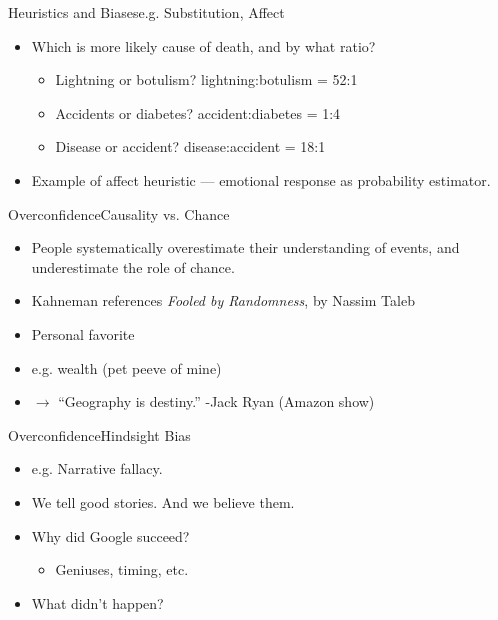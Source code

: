 \documentclass{beamer}
\begin{document}
\begin{frame}{Heuristics and Biases}{e.g. Substitution, Affect}
\begin{itemize}
\item Which is more likely cause of death, and by what ratio? 
    \begin{itemize}
    \addtolength{\itemsep}{0.5\baselineskip}
    \item Lightning or botulism? lightning:botulism = 52:1
    \item Accidents or diabetes? accident:diabetes = 1:4
    \item Disease or accident? disease:accident = 18:1
    \end{itemize}
\item Example of affect heuristic --- emotional response as probability estimator.
\end{itemize}
\end{frame}


\begin{frame}{Overconfidence}{Causality vs. Chance}
\begin{itemize}
\addtolength{\itemsep}{0.5\baselineskip}
\item People systematically overestimate their understanding of events, and underestimate the role of chance.
\item Kahneman references {\it Fooled by Randomness}, by Nassim Taleb
\item Personal favorite
\item e.g. wealth (pet peeve of mine)
\item $\rightarrow$ ``Geography is destiny.'' -Jack Ryan (Amazon show)
\end{itemize}

\end{frame}

\begin{frame}{Overconfidence}{Hindsight Bias}
\begin{itemize}
\addtolength{\itemsep}{0.5\baselineskip}
\item e.g. Narrative fallacy. 
\item We tell good stories. And we believe them.
\item Why did Google succeed?
  \begin{itemize}
  \item Geniuses, timing, etc.
  \end{itemize}
\item What didn't happen?
\end{itemize}
\end{frame}
\end{document}
